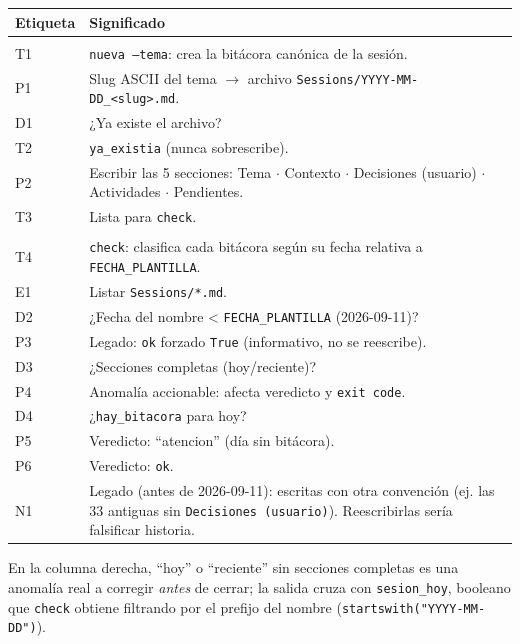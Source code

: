 \documentclass[11pt,a4paper]{article}
\begin{document}
\begin{center}
\vspace{6pt}
\begin{tcolorbox}[cajaContenido, title={\faIcon{table}~Leyenda de etiquetas}]
\small
\begin{tabularx}{\linewidth}{@{}>{\centering\arraybackslash}p{1.4cm}X@{}}
\toprule
\textbf{Etiqueta} & \textbf{Significado} \\ \midrule
\multicolumn{2}{@{}l}{\textit{Columna A --- ``nueva''}} \\ \midrule
T1 & \texttt{nueva --tema}: crea la bitácora canónica de la sesión. \\
P1 & Slug ASCII del tema $\rightarrow$ archivo \texttt{Sessions/YYYY-MM-DD\_<slug>.md}. \\
D1 & ¿Ya existe el archivo? \\
T2 & \texttt{ya\_existia} (nunca sobrescribe). \\
P2 & Escribir las 5 secciones: Tema $\cdot$ Contexto $\cdot$ Decisiones (usuario) $\cdot$ Actividades $\cdot$ Pendientes. \\
T3 & Lista para \texttt{check}. \\ \midrule
\multicolumn{2}{@{}l}{\textit{Columna B --- ``check''}} \\ \midrule
T4 & \texttt{check}: clasifica cada bitácora según su fecha relativa a \texttt{FECHA\_PLANTILLA}. \\
E1 & Listar \texttt{Sessions/*.md}. \\
D2 & ¿Fecha del nombre < \texttt{FECHA\_PLANTILLA} (2026-09-11)? \\
P3 & Legado: \texttt{ok} forzado \texttt{True} (informativo, no se reescribe). \\
D3 & ¿Secciones completas (hoy/reciente)? \\
P4 & Anomalía accionable: afecta veredicto y \texttt{exit code}. \\
D4 & ¿\texttt{hay\_bitacora} para hoy? \\
P5 & Veredicto: ``atencion'' (día sin bitácora). \\
P6 & Veredicto: \texttt{ok}. \\
N1 & Legado (antes de 2026-09-11): escritas con otra convención (ej. las 33 antiguas sin \texttt{Decisiones (usuario)}). Reescribirlas sería falsificar historia. \\
\bottomrule
\end{tabularx}
\end{tcolorbox}
\end{center}

En la columna derecha, ``hoy'' o ``reciente'' sin secciones completas es una anomalía
real a corregir \emph{antes} de cerrar; la salida cruza con \texttt{sesion\_hoy},
booleano que \texttt{check} obtiene filtrando por el prefijo del nombre
(\texttt{startswith("YYYY-MM-DD")}).
\end{document}
